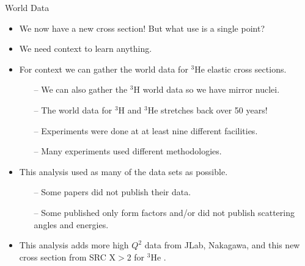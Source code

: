 \documentclass[10pt]{beamer}
\begin{document}
\begin{frame}[fragile]{World Data}

	\begin{itemize}
		\item We now have a \alert{new cross section}! \pause But what use is a \alert{single point}?
		\pause
		\item We need context to learn anything.
		\pause
		\item For context we can gather the \alert{world data} for $^3$He elastic cross sections.
		\begin{itemize}
			\item[--] We can also gather the \alert{$^3$H} world data so we have mirror nuclei.
			\item[--] The world data for $^3$H and $^3$He stretches back over \alert{50 years}!
			\item[--] Experiments were done at at least nine different facilities.
			\item[--] Many experiments used different methodologies.
		\end{itemize}
		\pause
		\item This analysis used as many of the data sets as possible.
			\begin{itemize}
				\item[--] Some papers \alert{did not publish their data}.
				\item[--] Some \alert{published only form factors and/or did not publish scattering angles and energies}.
			\end{itemize}
		\item This analysis adds more high $Q^2$ data from \alert{JLab}, \alert{Nakagawa}, and this \alert{new cross section from SRC X$>$2} for $^3$He .
	\end{itemize}

\end{frame}
\end{document}
